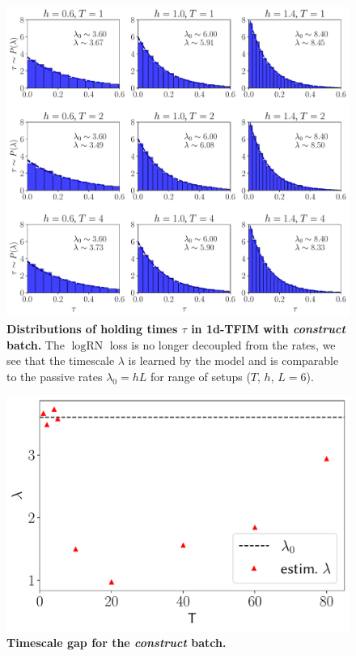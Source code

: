 \begin{figure}[H]
	\centering
	\includegraphics[width=1\linewidth]{Chapter5/Figs/Vector/troub}
	\caption[Distributions of holding times $\tau$ in 1d-TFIM with \emph{construct} batch]{\textbf{Distributions of holding times $\tau$ in 1d-TFIM with \emph{construct} batch.} The $\log\text{RN}$ loss is no longer decoupled from the rates, we see that the timescale $\lambda$ is learned by the model and is comparable to the passive rates $\lambda_0=hL$ for range of setups ($T$, $h$, $L=6$).}
	\label{fig:troub}
\end{figure}



\begin{figure}
	\centering
	\includegraphics[width=0.5\linewidth]{Chapter5/Figs/Vector/Tvlamb}
	\caption[Timescale gap for the \emph{construct} batch.]{\textbf{Timescale gap for the \emph{construct} batch.} }
	\label{fig:tvlamb}
\end{figure}



